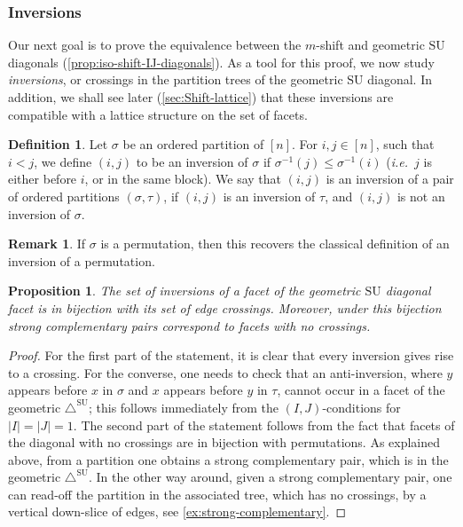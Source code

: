 \documentclass{amsart}
\newtheorem{proposition}[theorem]{Proposition}
\theoremstyle{definition}
\newtheorem{definition}[theorem]{Definition}
\newtheorem{remark}[theorem]{Remark}
\newcommand{\ie}{\textit{i.e.}~} %
\newcommand{\SU}{\mathrm{SU}}
\newcommand{\SUD}{\triangle^{\mathrm{SU}}}
\begin{document}

\subsubsection{Inversions}

Our next goal is to prove the equivalence between the $m$-shift and geometric $\SU$ diagonals (\cref{prop:iso-shift-IJ-diagonals}).
As a tool for this proof, we now study \emph{inversions}, or crossings in the partition trees of the geometric $\SU$ diagonal.
In addition, we shall see later (\cref{sec:Shift-lattice}) that these inversions are compatible with a lattice structure on the set of facets. 

\begin{definition}
Let $\sigma$ be an ordered partition of $[n]$.
For $i,j\in [n]$, such that $i<j$, we define $(i,j)$ to be an inversion of $\sigma$ if $\sigma^{-1}(j)\leq\sigma^{-1}(i)$ (\ie $j$ is either before $i$, or in the same block).
We say that $(i,j)$ is an inversion of a pair of ordered partitions $(\sigma,\tau)$, if $(i,j)$ is an inversion of $\tau$, and $(i,j)$ is not an inversion of $\sigma$.
\end{definition}

\begin{remark}
If $\sigma$ is a permutation, then this recovers the classical definition of an inversion of a permutation.
\end{remark}

\begin{proposition}
\label{p:crossings}
The set of inversions of a facet of the geometric $\SU$ diagonal facet is in bijection with its set of edge crossings. 
Moreover, under this bijection strong complementary pairs correspond to facets with no crossings.
\end{proposition}

\begin{proof}
For the first part of the statement, it is clear that every inversion gives rise to a crossing. 
For the converse, one needs to check that an anti-inversion, where $y$ appears before $x$ in $\sigma$ and $x$ appears before $y$ in $\tau$, cannot occur in a facet of the geometric $\SUD$; this follows immediately from the $(I,J)$-conditions for $|I|=|J|=1$. 
The second part of the statement follows from the fact that facets of the diagonal with no crossings are in bijection with permutations.
As explained above, from a partition one obtains a strong complementary pair, which is in the geometric $\SUD$. 
In the other way around, given a strong complementary pair, one can read-off the partition in the associated tree, which has no crossings, by a vertical down-slice of edges, see \cref{ex:strong-complementary}.
\end{proof}
\end{document}

